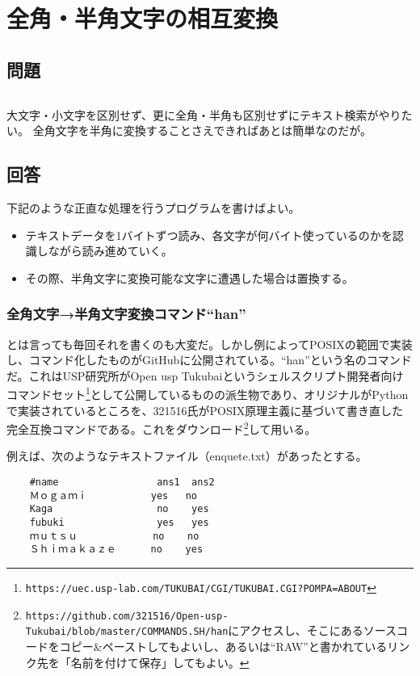 \section{全角・半角文字の相互変換}
\label{recipe:han_zen}

\subsection*{問題}
\noindent
$\!\!\!\!\!$
\begin{grshfboxit}{160.0mm}
	大文字・小文字を区別せず、更に全角・半角も区別せずにテキスト検索がやりたい。
	全角文字を半角に変換することさえできればあとは簡単なのだが。
\end{grshfboxit}

\subsection*{回答}
下記のような正直な処理を行うプログラムを書けばよい。
\begin{itemize}
  \item テキストデータを1バイトずつ読み、各文字が何バイト使っているのかを認識しながら読み進めていく。
  \item その際、半角文字に変換可能な文字に遭遇した場合は置換する。
\end{itemize}

\subsubsection*{全角文字→半角文字変換コマンド``han''}

とは言っても毎回それを書くのも大変だ。しかし例によってPOSIXの範囲で実装し、コマンド化したものがGitHubに公開されている。``han''という名のコマンドだ。これはUSP研究所がOpen usp Tukubaiというシェルスクリプト開発者向けコマンドセット\footnote{\verb|https://uec.usp-lab.com/TUKUBAI/CGI/TUKUBAI.CGI?POMPA=ABOUT|}として公開しているものの派生物であり、オリジナルがPythonで実装されているところを、321516氏がPOSIX原理主義に基づいて書き直した完全互換コマンドである。これをダウンロード\footnote{\verb|https://github.com/321516/Open-usp-Tukubai/blob/master/COMMANDS.SH/han|にアクセスし、そこにあるソースコードをコピー\&{}ペーストしてもよいし、あるいは``RAW''と書かれているリンク先を「名前を付けて保存」してもよい。}して用いる。

例えば、次のようなテキストファイル（enquete.txt）があったとする。\\
\begin{frameboxit}{160.0mm}
\begin{verbatim}
	#name                 ans1  ans2
	Ｍｏｇａｍｉ           yes   no
	Kaga                  no    yes
	fubuki                yes   yes
	ｍｕｔｓｕ             no    no
	Ｓｈｉｍａｋａｚｅ      no    yes
\end{verbatim}
\end{frameboxit}

